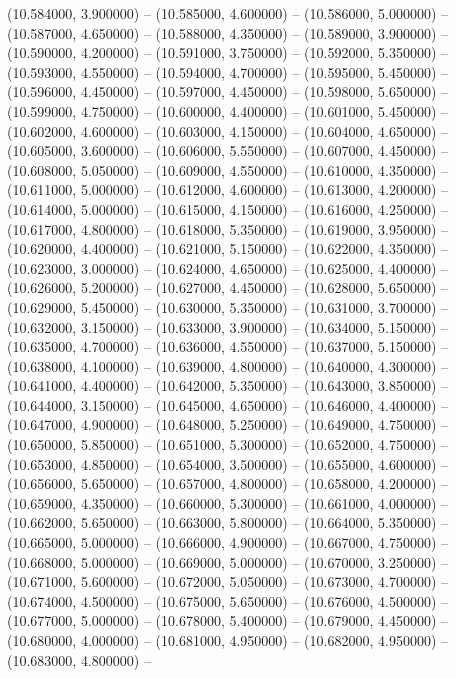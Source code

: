(10.584000, 3.900000) -- 
(10.585000, 4.600000) -- 
(10.586000, 5.000000) -- 
(10.587000, 4.650000) -- 
(10.588000, 4.350000) -- 
(10.589000, 3.900000) -- 
(10.590000, 4.200000) -- 
(10.591000, 3.750000) -- 
(10.592000, 5.350000) -- 
(10.593000, 4.550000) -- 
(10.594000, 4.700000) -- 
(10.595000, 5.450000) -- 
(10.596000, 4.450000) -- 
(10.597000, 4.450000) -- 
(10.598000, 5.650000) -- 
(10.599000, 4.750000) -- 
(10.600000, 4.400000) -- 
(10.601000, 5.450000) -- 
(10.602000, 4.600000) -- 
(10.603000, 4.150000) -- 
(10.604000, 4.650000) -- 
(10.605000, 3.600000) -- 
(10.606000, 5.550000) -- 
(10.607000, 4.450000) -- 
(10.608000, 5.050000) -- 
(10.609000, 4.550000) -- 
(10.610000, 4.350000) -- 
(10.611000, 5.000000) -- 
(10.612000, 4.600000) -- 
(10.613000, 4.200000) -- 
(10.614000, 5.000000) -- 
(10.615000, 4.150000) -- 
(10.616000, 4.250000) -- 
(10.617000, 4.800000) -- 
(10.618000, 5.350000) -- 
(10.619000, 3.950000) -- 
(10.620000, 4.400000) -- 
(10.621000, 5.150000) -- 
(10.622000, 4.350000) -- 
(10.623000, 3.000000) -- 
(10.624000, 4.650000) -- 
(10.625000, 4.400000) -- 
(10.626000, 5.200000) -- 
(10.627000, 4.450000) -- 
(10.628000, 5.650000) -- 
(10.629000, 5.450000) -- 
(10.630000, 5.350000) -- 
(10.631000, 3.700000) -- 
(10.632000, 3.150000) -- 
(10.633000, 3.900000) -- 
(10.634000, 5.150000) -- 
(10.635000, 4.700000) -- 
(10.636000, 4.550000) -- 
(10.637000, 5.150000) -- 
(10.638000, 4.100000) -- 
(10.639000, 4.800000) -- 
(10.640000, 4.300000) -- 
(10.641000, 4.400000) -- 
(10.642000, 5.350000) -- 
(10.643000, 3.850000) -- 
(10.644000, 3.150000) -- 
(10.645000, 4.650000) -- 
(10.646000, 4.400000) -- 
(10.647000, 4.900000) -- 
(10.648000, 5.250000) -- 
(10.649000, 4.750000) -- 
(10.650000, 5.850000) -- 
(10.651000, 5.300000) -- 
(10.652000, 4.750000) -- 
(10.653000, 4.850000) -- 
(10.654000, 3.500000) -- 
(10.655000, 4.600000) -- 
(10.656000, 5.650000) -- 
(10.657000, 4.800000) -- 
(10.658000, 4.200000) -- 
(10.659000, 4.350000) -- 
(10.660000, 5.300000) -- 
(10.661000, 4.000000) -- 
(10.662000, 5.650000) -- 
(10.663000, 5.800000) -- 
(10.664000, 5.350000) -- 
(10.665000, 5.000000) -- 
(10.666000, 4.900000) -- 
(10.667000, 4.750000) -- 
(10.668000, 5.000000) -- 
(10.669000, 5.000000) -- 
(10.670000, 3.250000) -- 
(10.671000, 5.600000) -- 
(10.672000, 5.050000) -- 
(10.673000, 4.700000) -- 
(10.674000, 4.500000) -- 
(10.675000, 5.650000) -- 
(10.676000, 4.500000) -- 
(10.677000, 5.000000) -- 
(10.678000, 5.400000) -- 
(10.679000, 4.450000) -- 
(10.680000, 4.000000) -- 
(10.681000, 4.950000) -- 
(10.682000, 4.950000) -- 
(10.683000, 4.800000) -- 

